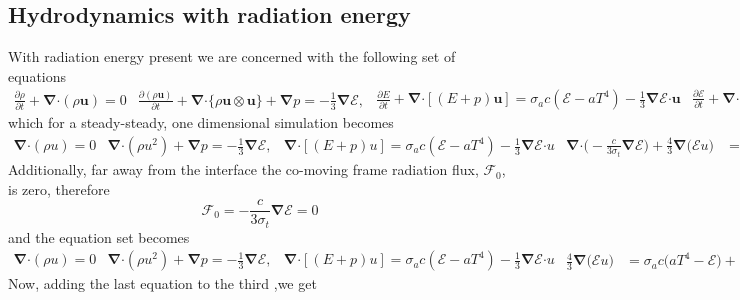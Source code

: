 \documentclass[10pt,letterpaper,notitlepage]{article}
\numberwithin{equation}{section}
\newcommand{\partialderiv}[2]{\frac{\partial #1}{\partial #2}}
\newcommand{\bnabla}{\boldsymbol{\nabla}}
\newcommand{\velocity}{\mathbf{u}}
\newcommand{\dotp}{\boldsymbol{\cdot}}
\newcommand{\RadE}{\mathcal{E}}
\newcommand{\RadF}{\boldsymbol{\mathcal{F}}}
\newcommand{\beqn}{\begin{equation}\begin{aligned}}
\newcommand{\eeqn}{\end{aligned}\end{equation}}
\begin{document}
\begin{appendices}
\vspace{1cm}
\subsection{Hydrodynamics with radiation energy}
With radiation energy present we are concerned with the following set of equations
\begin{subequations}
	\beqn 
	\partialderiv{\rho}{t} + \bnabla \dotp (\rho \velocity) = 0
	\eeqn 
	\beqn 
	\partialderiv{(\rho\velocity)}{t} + \bnabla \dotp \{ \rho \velocity \otimes \velocity\}  + \bnabla p 
	= -\frac{1}{3} \bnabla \RadE,
	\eeqn 
	\beqn 
	\partialderiv{E}{t} + \bnabla \dotp [(E + p)\velocity] 
	= \sigma_a c (\RadE - a T^4) - \frac{1}{3} \bnabla \RadE \dotp \velocity
	\eeqn 
	\beqn 
	\frac{\partial \RadE}{\partial t} 
	+\bnabla \dotp \biggr(  -\frac{c}{3\sigma_t} \bnabla \RadE \biggr) + \frac{4}{3} \bnabla \bigr( \RadE \mathbf{u}  \bigr)
	&=  \sigma_a c \bigr( aT^4 - \RadE \bigr)
	+\frac{1}{3} \bnabla \RadE  \dotp \velocity.
	\eeqn
\end{subequations}
which for a steady-steady, one dimensional simulation becomes
\begin{subequations}
	\beqn 
	\bnabla \dotp (\rho u) = 0
	\eeqn 
	\beqn 
   \bnabla \dotp ( \rho u^2 )  + \bnabla p 
	= -\frac{1}{3} \bnabla \RadE,
	\eeqn 
	\beqn 
    \bnabla \dotp [(E + p)u] 
	= \sigma_a c (\RadE - a T^4) - \frac{1}{3} \bnabla \RadE \dotp u
	\eeqn 
	\beqn 
	\bnabla \dotp \biggr(  -\frac{c}{3\sigma_t} \bnabla \RadE \biggr) + \frac{4}{3} \bnabla \bigr( \RadE u  \bigr)
	&=  \sigma_a c \bigr( aT^4 - \RadE \bigr)
	+\frac{1}{3} \bnabla \RadE u.
	\eeqn
\end{subequations}
Additionally, far away from the interface the co-moving frame radiation flux, $\RadF_0$, is zero, therefore
$$
\RadF_0 = -\frac{c}{3\sigma_t} \bnabla \RadE = 0
$$
and the equation set becomes
\begin{subequations}
	\beqn 
	\bnabla \dotp (\rho u) = 0
	\eeqn 
	\beqn 
	\bnabla \dotp ( \rho u^2 )  + \bnabla p 
	= -\frac{1}{3} \bnabla \RadE,
	\eeqn 
	\beqn 
	\bnabla \dotp [(E + p)u] 
	= \sigma_a c (\RadE - a T^4) - \frac{1}{3} \bnabla \RadE \dotp u
	\eeqn 
	\beqn 
	\frac{4}{3} \bnabla \bigr( \RadE u  \bigr)
	&=  \sigma_a c \bigr( aT^4 - \RadE \bigr)
	+\frac{1}{3} \bnabla \RadE u.
	\eeqn
\end{subequations}
Now, adding the last equation to the third ,we get


\end{appendices}
\end{document}
